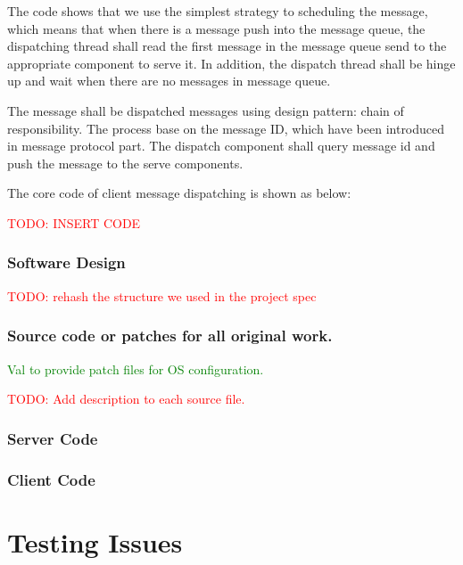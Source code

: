 \documentclass[11pt,a4paper,titlepage]{report}
\begin{document}
The code shows that we use the simplest strategy to scheduling the message, which means that when there is a message push into the message queue, the dispatching thread shall read the first message in the message queue send to the appropriate component to serve it. In addition, the dispatch thread shall be hinge up and wait when there are no messages in message queue.

The message shall be dispatched messages using design pattern: chain of responsibility. The process base on the message ID, which have been introduced in message protocol part. The dispatch component shall query message id and push the message to the serve components.

The core code of client message dispatching is shown as below:

\textcolor{red}{TODO: INSERT CODE}





\subsubsection{Software Design}

\textcolor{red}{TODO: rehash the structure we used in the project spec}


\subsubsection{Source code or patches for all original work.}


\textcolor{green}{Val to provide patch files for OS configuration.}

\textcolor{red}{TODO: Add description to each source file.}


\subsubsection{Server Code}



\subsubsection{Client Code}




\section{Testing Issues}
\end{document}
